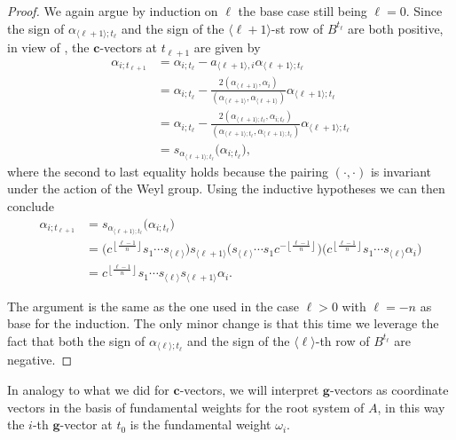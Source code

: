 \documentclass[12pt]{amsart}
\newcommand{\bfc}{\mathbf{c}}
\newcommand{\bfg}{\mathbf{g}}
\newcommand{\cv}{\alpha}
\renewcommand{\mod}[1]{\langle {#1} \rangle}
\newcommand{\Zidx}{\ell}
\theoremstyle{remark}
\numberwithin{equation}{section}
\numberwithin{figure}{section}
\begin{document}
\begin{proof}
  \noindent{\bf Case $\Zidx > 0$.}
  We again argue by induction on $\Zidx$ the base case still being $\Zidx=0$.
  Since the sign of $\cv_{\mod{\Zidx+1};t_\Zidx}$ and the sign of the $\mod{\Zidx+1}$-st row of $B^{t_\Zidx}$ are both positive, in view of \cite[Proposition 1.3]{NZ12}, the $\bfc$-vectors at $t_{\Zidx+1}$ are given by
  \begin{align*}
    \cv_{i;t_{\Zidx+1}} 
    &= 
    \cv_{i;t_\Zidx} - a_{\mod{\Zidx+1},i} \cv_{\mod{\Zidx+1};t_\Zidx}\\
    &=
    \cv_{i;t_\Zidx} - \frac{2(\alpha_{\mod{\Zidx+1}},\alpha_i)}{(\alpha_{\mod{\Zidx+1}},\alpha_{\mod{\Zidx+1}})} \cv_{\mod{\Zidx+1};t_\Zidx}\\
    &=
    \cv_{i;t_\Zidx} - \frac{2(\cv_{\mod{\Zidx+1};t_\Zidx},\cv_{i;t_\Zidx})}{(\cv_{\mod{\Zidx+1};t_\Zidx},\cv_{\mod{\Zidx+1};t_\Zidx})} \cv_{\mod{\Zidx+1};t_\Zidx}\\
    &=
    s_{\cv_{\mod{\Zidx+1};t_\Zidx}}\big(\cv_{i;t_\Zidx}\big),
  \end{align*}
  where the second to last equality holds because the pairing $(\cdot,\cdot)$ is invariant under the action of the Weyl group.
  Using the inductive hypotheses we can then conclude
  \begin{align*}
    \cv_{i;t_{\Zidx+1}} 
    &=
    s_{\cv_{\mod{\Zidx+1};t_\Zidx}}\big(\cv_{i;t_\Zidx}\big)\\
    &=
    \big(c^{\left\lfloor\frac{\Zidx-1}{n}\right\rfloor}s_1\cdots s_{\mod{\Zidx}}\big)s_{\mod{\Zidx+1}}\big(s_{\mod{\Zidx}}\cdots s_1 c^{-\left\lfloor\frac{\Zidx-1}{n}\right\rfloor}\big)\big(c^{\left\lfloor\frac{\Zidx-1}{n}\right\rfloor}s_1\cdots s_{\mod{\Zidx}}\alpha_i\big)\\
    &= 
    c^{\left\lfloor\frac{\Zidx-1}{n}\right\rfloor}s_1\cdots s_{\mod{\Zidx}}s_{\mod{\Zidx+1}} \alpha_i.
  \end{align*}

  \noindent{\bf Case $\Zidx < -n$.}
  The argument is the same as the one used in the case $\Zidx>0$ with $\Zidx=-n$ as base for the induction.
  The only minor change is that this time we leverage the fact that both the sign of $\cv_{\mod{\Zidx};t_\Zidx}$ and the sign of the $\mod{\Zidx}$-th row of $B^{t_\Zidx}$ are negative.
\end{proof}

In analogy to what we did for $\bfc$-vectors, we will interpret $\bfg$-vectors as coordinate vectors in the basis of fundamental weights for the root system of $A$, in this way the $i$-th $\bfg$-vector at $t_0$ is the fundamental weight $\omega_i$.
\end{document}
